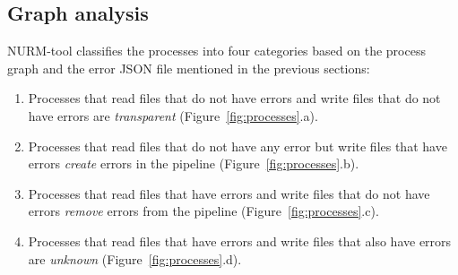 \documentclass[a4paper,num-refs]{oup-contemporary}
\begin{document}
\subsection{Graph analysis}

NURM-tool classifies the processes into four 
categories based on the process graph and the error JSON file 
mentioned in the previous sections:
\begin{enumerate}
\item Processes that read files that do not have errors and write files 
that do not have errors are \emph{transparent} (Figure~\ref{fig:processes}.a).
\item Processes that read files 
that do not have any error but write files that have errors 
\emph{create} errors in the pipeline (Figure~\ref{fig:processes}.b).
\item Processes that read files 
that have errors and write files that do not have errors \emph{remove} 
errors from the pipeline (Figure~\ref{fig:processes}.c).
\item Processes that read files that have errors and write files that also have errors are 
\emph{unknown} (Figure~\ref{fig:processes}.d).
\end{enumerate}
\end{document}
